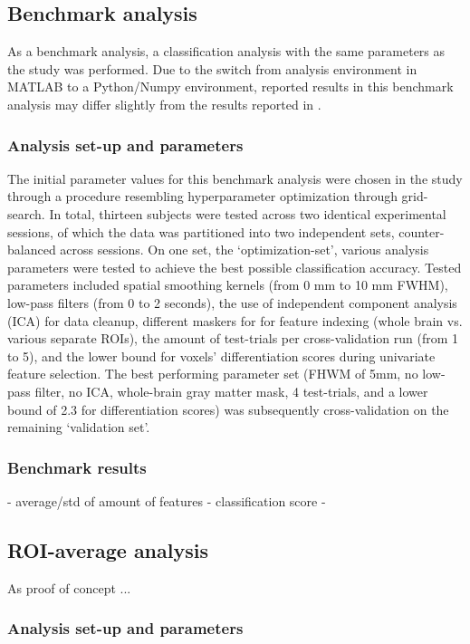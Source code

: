 \documentclass[jou,12pt,a4paper]{apa6}
\begin{document}
\subsection{Benchmark analysis}
As a benchmark analysis, a classification analysis with the same parameters as the  study was performed. Due to the switch from analysis environment in MATLAB to a Python/Numpy environment, reported results in this benchmark analysis may differ slightly from the results reported in .

\subsubsection{Analysis set-up and parameters}
The initial parameter values for this benchmark analysis were chosen in the  study through a procedure resembling hyperparameter optimization through grid-search. In total, thirteen subjects were tested across two identical experimental sessions, of which the data was partitioned into two independent sets, counter-balanced across sessions. On one set, the `optimization-set', various analysis parameters were tested to achieve the best possible classification accuracy. Tested parameters included spatial smoothing kernels (from 0 mm to 10 mm FWHM), low-pass filters (from 0 to 2 seconds), the use of independent component analysis (ICA) for data cleanup, different maskers for for feature indexing (whole brain vs. various separate ROIs), the amount of test-trials per cross-validation run (from 1 to 5), and the lower bound for voxels' differentiation scores during univariate feature selection. The best performing parameter set (FHWM of 5mm, no low-pass filter, no ICA, whole-brain gray matter mask, 4 test-trials, and a lower bound of 2.3 for differentiation scores) was subsequently cross-validation on the remaining `validation set'. 

\subsubsection{Benchmark results}
- average/std of amount of features
- classification score
- 
 
\subsection{ROI-average analysis}
As proof of concept ...

\subsubsection{Analysis set-up and parameters}
\end{document}
